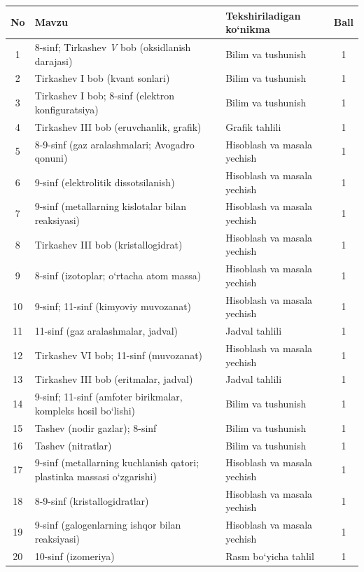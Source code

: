 \documentclass[11pt,a4paper]{article}
\begin{document}
{\small\noindent\begin{longtable}{|c|p{7.2cm}|p{5.4cm}|c|}\hline \textbf{No} & \textbf{Mavzu} & \textbf{Tekshiriladigan ko`nikma} & \textbf{Ball}\\\hline
1 & 8-sinf; Tirkashev \textit{V} bob (oksidlanish darajasi) & Bilim va tushunish & 1\\\hline
2 & Tirkashev I bob (kvant sonlari) & Bilim va tushunish & 1\\\hline
3 & Tirkashev I bob; 8-sinf (elektron konfiguratsiya) & Bilim va tushunish & 1\\\hline
4 & Tirkashev III bob (eruvchanlik, grafik) & Grafik tahlili & 1\\\hline
5 & 8-9-sinf (gaz aralashmalari; Avogadro qonuni) & Hisoblash va masala yechish & 1\\\hline
6 & 9-sinf (elektrolitik dissotsilanish) & Hisoblash va masala yechish & 1\\\hline
7 & 9-sinf (metallarning kislotalar bilan reaksiyasi) & Hisoblash va masala yechish & 1\\\hline
8 & Tirkashev III bob (kristallogidrat) & Hisoblash va masala yechish & 1\\\hline
9 & 8-sinf (izotoplar; o`rtacha atom massa) & Hisoblash va masala yechish & 1\\\hline
10 & 9-sinf; 11-sinf (kimyoviy muvozanat) & Hisoblash va masala yechish & 1\\\hline
11 & 11-sinf (gaz aralashmalar, jadval) & Jadval tahlili & 1\\\hline
12 & Tirkashev VI bob; 11-sinf (muvozanat) & Hisoblash va masala yechish & 1\\\hline
13 & Tirkashev III bob (eritmalar, jadval) & Jadval tahlili & 1\\\hline
14 & 9-sinf; 11-sinf (amfoter birikmalar, kompleks hosil bo`lishi) & Bilim va tushunish & 1\\\hline
15 & Tashev (nodir gazlar); 8-sinf & Bilim va tushunish & 1\\\hline
16 & Tashev (nitratlar) & Bilim va tushunish & 1\\\hline
17 & 9-sinf (metallarning kuchlanish qatori; plastinka massasi o`zgarishi) & Hisoblash va masala yechish & 1\\\hline
18 & 8-9-sinf (kristallogidratlar) & Hisoblash va masala yechish & 1\\\hline
19 & 9-sinf (galogenlarning ishqor bilan reaksiyasi) & Hisoblash va masala yechish & 1\\\hline
20 & 10-sinf (izomeriya) & Rasm bo`yicha tahlil & 1\\\hline

\end{longtable}}
\end{document}
